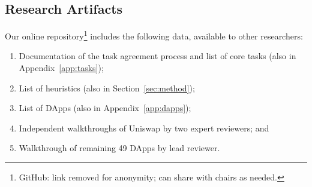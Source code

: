 \documentclass[conference]{IEEEtran}
\begin{document}









%
%
%



\appendix

\subsection{Research Artifacts}

Our online repository\footnote{GitHub: link removed for anonymity; can share with chairs as needed.} includes the following data, available to other researchers:

\begin{enumerate}
\item Documentation of the task agreement process and list of core tasks (also in Appendix~\ref{app:tasks});
\item List of heuristics (also in Section~\ref{sec:method});
\item List of DApps (also in Appendix~\ref{app:dapps});
\item Independent walkthroughs of Uniswap by two expert reviewers; and
\item Walkthrough of remaining 49 DApps by lead reviewer. 
\end{enumerate}
\end{document}
